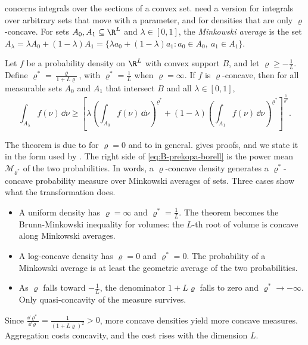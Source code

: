  concerns integrals over the sections of a convex set. \citet{CaplinNalebuff1991} need a
version for integrals over arbitrary sets that move with a parameter, and for densities that are only
$\varrho$-concave. For sets $A_0, A_1 \subseteq \R^L$ and $\lambda \in [0, 1]$, the \emph{Minkowski average} is the set
$A_\lambda = \lambda A_0 + (1 - \lambda)A_1 = \{\lambda a_0 + (1 - \lambda)a_1 : a_0 \in A_0,\ a_1 \in A_1\}$.

\begin{theorem}\label{thm:B-prekopa-borell}
Let $f$ be a probability density on $\R^L$ with convex support $B$, and let $\varrho \geq -\frac{1}{L}$. Define
$\varrho^* = \frac{\varrho}{1 + L\varrho}$, with $\varrho^* = \frac{1}{L}$ when $\varrho = \infty$. If $f$ is $\varrho$-concave,
then for all measurable sets $A_0$ and $A_1$ that intersect $B$ and all $\lambda \in [0, 1]$,
\begin{equation}\label{eq:B-prekopa-borell}
  \int_{A_\lambda} f(\nu)\,\dd\nu \geq
  \left[\lambda\left(\int_{A_0}f(\nu)\,\dd\nu\right)^{\varrho^*} + (1 - \lambda)\left(\int_{A_1}f(\nu)\,\dd\nu\right)^{\varrho^*}\right]^{\frac{1}{\varrho^*}}.
\end{equation}
\end{theorem}

The theorem is due to \citet{Prekopa1971} for $\varrho = 0$ and to \citet{Borell1975} in general.
\citet{DasGupta1980} gives proofs, and we state it in the form used by \citet[Section 4]{CaplinNalebuff1991}.
The right side of \eqref{eq:B-prekopa-borell} is the power mean $\mathcal{M}_{\varrho^*}$ of the two probabilities. In
words, a $\varrho$-concave density generates a $\varrho^*$-concave probability measure over Minkowski averages of
sets. Three cases show what the transformation does.
\begin{itemize}
  \item A uniform density has $\varrho = \infty$ and $\varrho^* = \frac{1}{L}$. The theorem becomes the
  Brunn-Minkowski inequality for volumes: the $L$-th root of volume is concave along Minkowski averages.
  \item A log-concave density has $\varrho = 0$ and $\varrho^* = 0$. The probability of a Minkowski average is at least
  the geometric average of the two probabilities.
  \item As $\varrho$ falls toward $-\frac{1}{L}$, the denominator $1 + L\varrho$ falls to zero and $\varrho^* \to -\infty$. Only
  quasi-concavity of the measure survives.
\end{itemize}
Since $\frac{\dd\varrho^*}{\dd\varrho} = \frac{1}{(1 + L\varrho)^2} > 0$, more concave densities yield more concave
measures. Aggregation costs concavity, and the cost rises with the dimension $L$.


